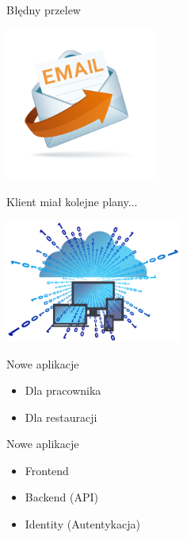 \documentclass{beamer}
\begin{document}
\begin{frame}{Błędny przelew}
	\begin{center}
		\includegraphics[height=5cm]{email2.jpg}
	\end{center}
\end{frame}

\begin{frame}{}
	\begin{center}
		\Huge{Klient miał kolejne plany...}
	\end{center}
\end{frame}

\begin{frame}{}
	\begin{center}
		\includegraphics[height=4cm]{virtual1.png}
	\end{center}
\end{frame}

\begin{frame}{Nowe aplikacje}
	\begin{huge}
		\begin{itemize}
			\item Dla pracownika
			\item Dla restauracji
		\end{itemize}
	\end{huge}
\end{frame}

\begin{frame}{Nowe aplikacje}
	\begin{huge}
		\begin{itemize}
			\item Frontend
			\item Backend (API)
			\item Identity (Autentykacja)
		\end{itemize}
	\end{huge}
\end{frame}
\end{document}
